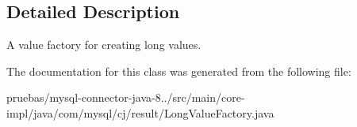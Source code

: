 \subsection{Detailed Description}
A value factory for creating long values. 

The documentation for this class was generated from the following file\+:\begin{DoxyCompactItemize}
\item 
pruebas/mysql-\/connector-\/java-\/8../src/main/core-\/impl/java/com/mysql/cj/result/Long\+Value\+Factory.\+java\end{DoxyCompactItemize}
